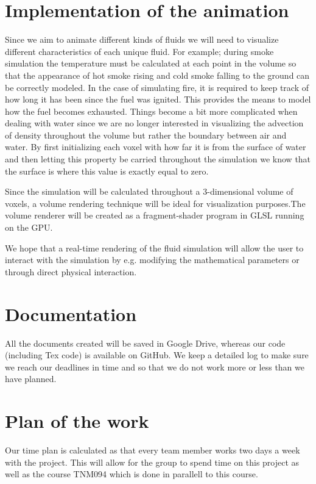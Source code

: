 \documentclass[a4paper,12pt,twoside,swedish]{report}
\begin{document}
\section{Implementation of the animation}
Since we aim to animate different kinds of fluids we will need to visualize different characteristics of each unique fluid.
For example; during smoke simulation the temperature must be calculated at each point in the volume so that the appearance of hot smoke rising and cold smoke falling to the ground can be correctly modeled. In the case of simulating fire, it is required to keep track of how long it has been since the fuel was ignited. This provides the means to model how the fuel becomes exhausted.
Things become a bit more complicated when dealing with water since we are no longer interested in visualizing the advection of density throughout the volume but rather the boundary between air and water. By first initializing each voxel with how far it is from the surface of water and then letting this property be carried throughout the simulation we know that the surface is where this value is exactly equal to zero.


Since the simulation will be calculated throughout a 3-dimensional volume of voxels, a volume rendering technique will be ideal for visualization purposes.The volume renderer will be created as a fragment-shader program   in GLSL running on the GPU.

We hope that a real-time rendering of the fluid simulation will allow the user to interact with the simulation by e.g. modifying the mathematical parameters or through direct physical interaction.\\

\section{Documentation}
All the documents created will be saved in Google Drive, whereas our code (including Tex code) is available on GitHub.
We keep a detailed log to make sure we reach our deadlines in time and so that we do not work more or less than we have planned.

\section{Plan of the work}
Our time plan is calculated as that every team member works two days a week with the project. This will allow for the group to spend time on this project as well as the course TNM094 which is done in parallell to this course.
\end{document}
